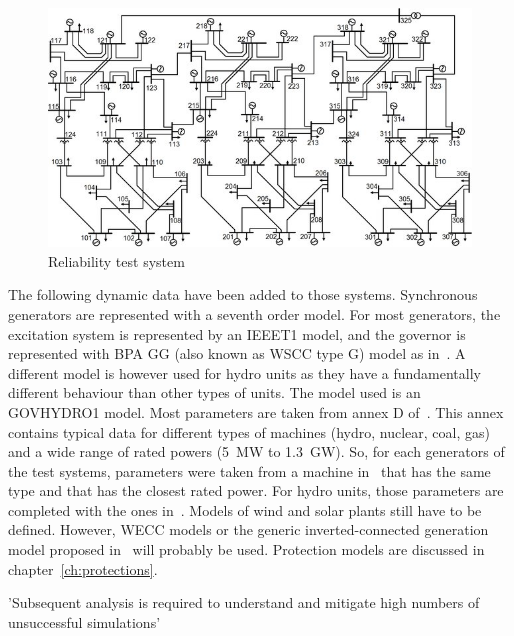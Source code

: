 \begin{figure}
    \centering
    \includegraphics[width=0.8\linewidth]{Figs/RTS.jpg}
    \caption{Reliability test system~\cite{RTS-figure}}
    \label{fig:rts}
\end{figure}

The following dynamic data have been added to those systems. Synchronous generators are represented with a seventh order model. For most generators, the excitation system is represented by an IEEET1 model, and the governor is represented with BPA GG (also known as WSCC type G) model as in~\cite{excitationAndGovernorModels}. A different model is however used for hydro units as they have a fundamentally different behaviour than other types of units. The model used is an GOVHYDRO1 model. Most parameters are taken from annex D of~\cite{vittalBook}. This annex contains typical data for different types of machines (hydro, nuclear, coal, gas) and a wide range of rated powers (5~MW to 1.3~GW). So, for each generators of the test systems, parameters were taken from a machine in~\cite{vittalBook} that has the same type and that has the closest rated power. For hydro units, those parameters are completed with the ones in~\cite{hydroGov}. Models of wind and solar plants still have to be defined. However, WECC models or the generic inverted-connected generation model proposed in~\cite{ChaspierreThesis} will probably be used. Protection models are discussed in chapter~\ref{ch:protections}.


'Subsequent analysis is required to understand and mitigate high
numbers of unsuccessful simulations'\cite{EurostagHPC}






